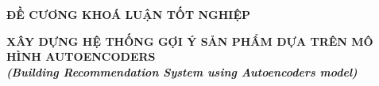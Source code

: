 \documentclass{article}[14pt]
\begin{document}
    \begin{figure}[h]
        \begin{floatrow}
        {%
    
        }
        {%
    
        }
        \end{floatrow}
    \end{figure}
    
    \begin{center}
        
        \textbf{\Large ĐỀ CƯƠNG KHOÁ LUẬN TỐT NGHIỆP} \\ 
    \end{center}
    
    
    \begin{center}
        
        \textbf{\huge  XÂY DỰNG HỆ THỐNG GỢI Ý SẢN PHẨM DỰA TRÊN MÔ HÌNH AUTOENCODERS} \\
        
    \vspace{.5cm}
        \textit{\textbf{\Large (Building Recommendation System using Autoencoders model)}}
    \end{center}
    
\end{document}
